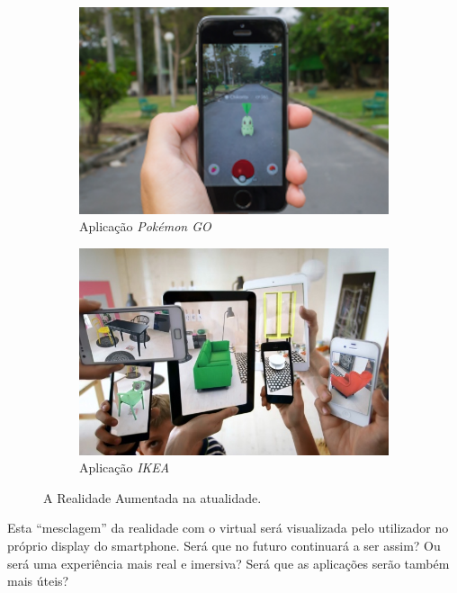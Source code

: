 \documentclass{report}
\begin{document}
\begin{figure}[H]
    \begin{subfigure}[b]{.45\linewidth}
        \includegraphics[width=\linewidth]{pokemongo.png}
        \caption{Aplicação \textit{Pokémon GO}}\label{fig:pokemongo}
    \end{subfigure}
    \begin{subfigure}[b]{.45\linewidth}
        \includegraphics[width=\linewidth]{ikea.png}
        \caption{Aplicação \textit{IKEA}}\label{fig:ikea}
    \end{subfigure}
\caption{A Realidade Aumentada na atualidade.}
\label{fig:applications0}
\end{figure}

Esta “mesclagem” da realidade com o virtual será visualizada pelo utilizador no próprio display do smartphone. Será que no futuro continuará a ser assim? Ou será uma experiência mais real e imersiva? Será que as aplicações serão também mais úteis?
\end{document}
